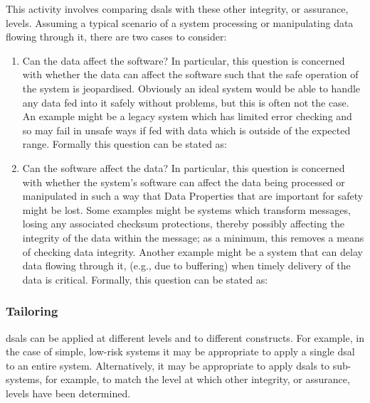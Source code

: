This activity involves comparing \glspl{dsal} with these other integrity, or assurance, levels. Assuming a typical scenario of a system processing or manipulating data flowing through it, there are two cases to consider:

\begin{enumerate}
  \item Can the data affect the software? In particular, this question is concerned with whether the data can affect the software such that the safe operation of the system is jeopardised. Obviously an ideal system would be able to handle any data fed into it safely without problems, but this is often not the case. An example might be a legacy system which has limited error checking and so may fail in unsafe ways if fed with data which is outside of the expected range. Formally this question can be stated as: 
  \item Can the software affect the data? In particular, this question is concerned with whether the system's software can affect the data being processed or manipulated in such a way that Data Properties that are important for safety might be lost. Some examples might be systems which transform messages, losing any associated checksum protections, thereby possibly affecting the integrity of the data within the message; as a minimum, this removes a means of checking data integrity. Another example might be a system that can delay data flowing through it, (e.g., due to buffering) when timely delivery of the data is critical. Formally, this question can be stated as: 
\end{enumerate}

\subsubsection{Tailoring}\label{bkm:activities:analyse:tailoring}
\glspl{dsal} can be applied at different levels and to different constructs. For example, in the case of simple, low-risk systems it may be appropriate to apply a single \gls{dsal} to an entire system. Alternatively, it may be appropriate to apply \glspl{dsal} to sub-systems, for example, to match the level at which other integrity, or assurance, levels have been determined. 

